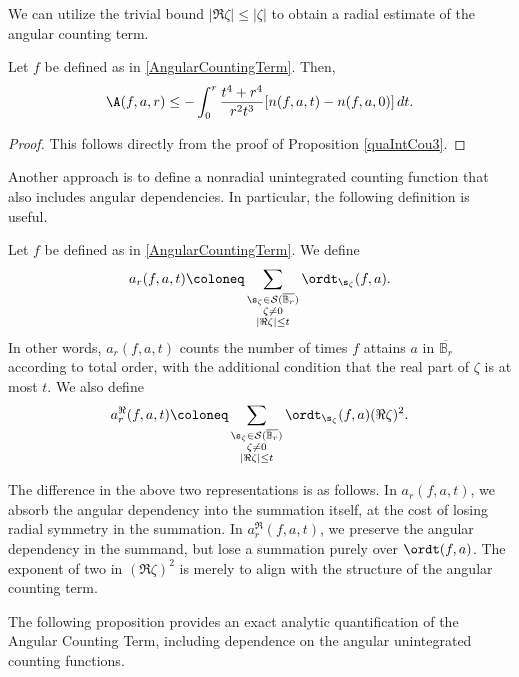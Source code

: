 \documentclass{amsart}
\begin{document}
We can utilize the trivial bound $|\Re \zeta|\leq |\zeta|$ to obtain a radial estimate of the angular counting term. 

\begin{prop}
    Let $f$ be defined as in \ref{AngularCountingTerm}. Then, \begin{align*}
    \A(f,a,r)\leq -\int_0^r\frac{t^4+r^4}{r^2t^3}[n(f,a,t)-n(f,a,0)]\,dt.
    \end{align*}
\end{prop}
\begin{proof}
    This follows directly from the proof of Proposition \ref{quaIntCou3}.
\end{proof}

Another approach is to define a nonradial unintegrated counting function that also includes angular dependencies. In particular, the following definition is useful. 

\begin{defin}
    Let $f$ be defined as in \ref{AngularCountingTerm}. We define \[a_r(f,a,t)\coloneq \sum_{\substack{ \s_\zeta\in\mathcal{S}(\overline{\mathbb B_r}) \\ \zeta\neq 0 \\|\Re \zeta|\leq t}}\ordt_{\s_\zeta}(f,a).\] In other words, $a_r(f,a,t)$ counts the number of times $f$ attains $a$ in $\overline{\mathbb{B}_r}$ according to total order, with the additional condition that the real part of $\zeta$ is at most $t$. We also define \[a_r^\Re (f,a,t)\coloneq \sum_{\substack{ \s_\zeta\in\mathcal{S}(\overline{\mathbb B_r}) \\ \zeta\neq 0 \\|\Re \zeta|\leq t}}\ordt_{\s_\zeta}(f,a)(\Re \zeta)^2.\]
\end{defin}
\begin{remark}
    The difference in the above two representations is as follows. In $a_r(f,a,t)$, we absorb the angular dependency into the summation itself, at the cost of losing radial symmetry in the summation. In $a_r^\Re(f,a,t)$, we preserve the angular dependency in the summand, but lose a summation purely over $\ordt(f,a)$. The exponent of two in $(\Re\zeta)^2$ is merely to align with the structure of the angular counting term. 
\end{remark}

The following proposition provides an exact analytic quantification of the Angular Counting Term, including dependence on the angular unintegrated counting functions. 
\end{document}
